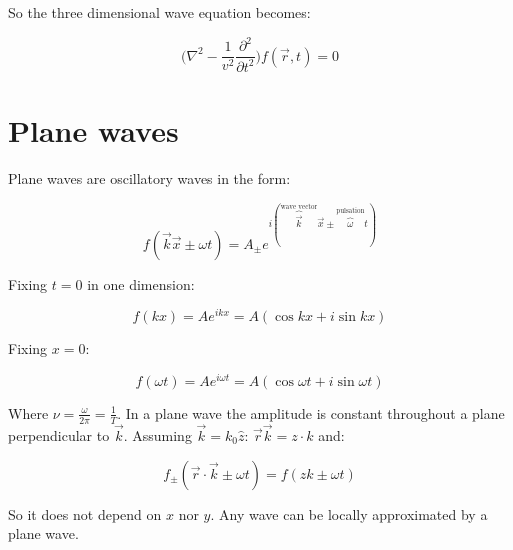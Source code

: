   So the three dimensional wave equation becomes:

  $$\biggl(\nabla^2 - \frac{1}{v^2}\frac{\partial^2{}}{\partial{t^2}}\biggr)f(\vec{r},t) = 0$$

\section{Plane waves}
Plane waves are oscillatory waves in the form:

$$f(\vec{k}\vec{x}\pm\omega t) = A_{\pm}e^{i(\overbrace{\vec{k}}^{\text{wave vector}}\vec{x}\pm\overbrace{\omega}^{\text{pulsation}} t)}$$

Fixing $t = 0$ in one dimension:

$$f(kx) = Ae^{ikx} = A(\cos kx + i\sin kx)$$

Fixing $x = 0$:

$$f(\omega t) = Ae^{i\omega t} = A(\cos\omega t + i\sin\omega t)$$

Where $\nu = \frac{\omega}{2\pi} = \frac{1}{T}$.
In a plane wave the amplitude is constant throughout a plane perpendicular to $\vec{k}$.
Assuming $\vec{k} = k_0\hat{z}$: $\vec{r}\vec{k} = z\cdot k$ and:

$$f_\pm (\vec{r}\cdot \vec{k}\pm\omega t) = f(zk\pm \omega t)$$

So it does not depend on $x$ nor $y$.
Any wave can be locally approximated by a plane wave.
